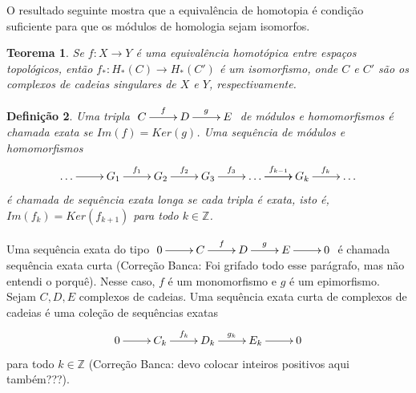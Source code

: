 \documentclass[12pt]{book}
\newtheorem{teorema}{Teorema}[section]
\newtheorem{definicao}[teorema]{Definição}
\newcommand{\homologiaabrev}[2]{H_{#1}(#2)}
\newcommand{\inteiros}{\mathbb{Z}}
\newcommand{\alerta}[1]{{\color{red}#1}}
\newcommand{\correcaobanca}[1]{\alerta{(Correção Banca: #1)}}
\begin{document}
	O resultado seguinte mostra que a equivalência de homotopia é condição suficiente para que os módulos de homologia sejam isomorfos.
	
	\begin{teorema}
		Se $f: X \to Y$ é uma equivalência homotópica entre espaços topológicos, então $f_{*}:\homologiaabrev{*}{C} \to \homologiaabrev{*}{C'}$ é um isomorfismo, onde $C$ e $C'$ são os complexos de cadeias singulares de $X$ e $Y$, respectivamente.
	\end{teorema}
	
	\begin{definicao}
		Uma tripla $\xymatrix{C\ar[r]^{f} & D\ar[r]^{g} & E }$ de módulos e homomorfismos é chamada exata se $Im(f) = Ker(g)$. Uma sequência de módulos e homomorfismos
		$$
		\xymatrix{\dots \ar[r]& G_{1}\ar[r]^{f_{1}} & G_{2}\ar[r]^{f_{2}} & G_{3}\ar[r]^{f_{3}} & \dots \ar[r]\ar[r]^{f_{k-1}} & G_{k}\ar[r]^{f_{k}} &\dots}
		$$
		é chamada de sequência exata longa se cada tripla é exata, isto é, $Im(f_{k}) = Ker(f_{k+1})$ para todo $k\in \inteiros$.
	\end{definicao}
	
	Uma sequência exata do tipo $ \xymatrix{0 \ar[r] & C\ar[r]^{f} & D\ar[r]^{g} & E \ar[r]& 0}$ é chamada sequência exata curta \correcaobanca{Foi grifado todo esse parágrafo, mas não entendi o porquê}. Nesse caso, $f$ é um monomorfismo e $g$ é um epimorfismo. Sejam $C, D, E$ complexos de cadeias. Uma sequência exata curta de complexos de cadeias é uma coleção de sequências exatas
	$$ 
	\xymatrix{0 \ar[r] & C_{k}\ar[r]^{f_{k}} & D_{k}\ar[r]^{g_{k}} & E_{k} \ar[r]& 0}
	$$
	para todo $k \in \inteiros$ \correcaobanca{devo colocar inteiros positivos aqui também???}.
	
\end{document}
